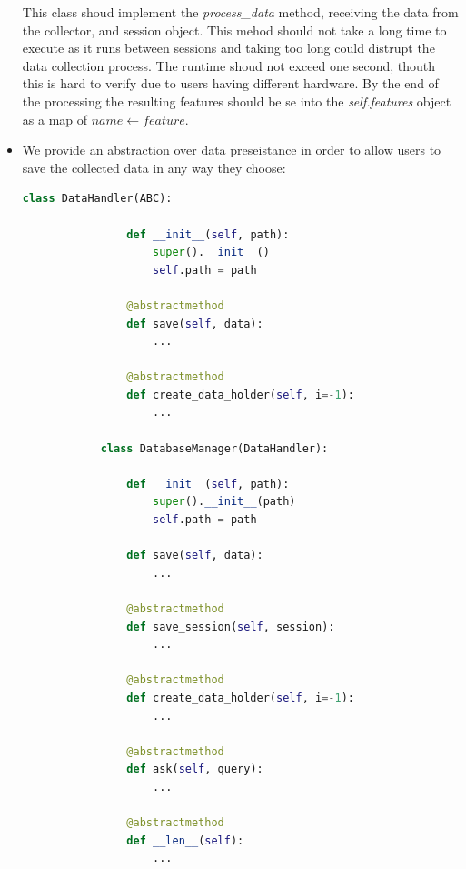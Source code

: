 \documentclass[../main.tex]{subfiles}
\begin{document}
\begin{itemize}
        This class shoud implement the \textit{process\_data} method, receiving the data from the collector, and session object. This mehod should not take a long time
        to execute as it runs between sessions and taking too long could distrupt the data collection process. The runtime shoud not exceed one second, thouth this 
        is hard to verify due to users having different hardware. By the end of the processing the resulting features should be se into the \textit{self.features} object 
        as a map of $name \leftarrow feature$.
    \item We provide an abstraction over data preseistance in order to allow users to save the collected data in any way they choose:
        \begin{lstlisting}[language=Python]
            class DataHandler(ABC):

                def __init__(self, path):
                    super().__init__()
                    self.path = path

                @abstractmethod
                def save(self, data):
                    ...

                @abstractmethod
                def create_data_holder(self, i=-1):
                    ...

            class DatabaseManager(DataHandler):

                def __init__(self, path):
                    super().__init__(path)
                    self.path = path
            
                def save(self, data):
                    ...
            
                @abstractmethod
                def save_session(self, session):
                    ...
            
                @abstractmethod
                def create_data_holder(self, i=-1):
                    ...
            
                @abstractmethod
                def ask(self, query):
                    ...
            
                @abstractmethod
                def __len__(self):
                    ...
            

\end{lstlisting}
\end{itemize}
\end{document}
